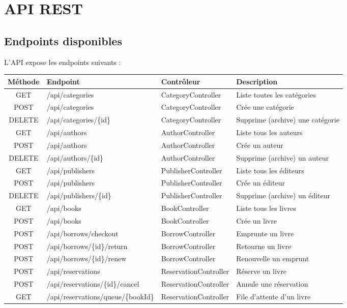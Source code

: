 \documentclass[12pt,a4paper,twoside]{report}
\begin{document}
\chapter{API REST}

\section{Endpoints disponibles}

L'API expose les endpoints suivants :

\begin{longtable}{c l l p{6cm}}
\hline
\rowcolor[gray]{0.9}
\textbf{Méthode} & \textbf{Endpoint} & \textbf{Contrôleur} & \textbf{Description} \\
\hline
\endfirsthead
\hline
\endfoot
GET & /api/categories & CategoryController & Liste toutes les catégories \\
POST & /api/categories & CategoryController & Crée une catégorie \\
DELETE & /api/categories/\{id\} & CategoryController & Supprime (archive) une catégorie \\
GET & /api/authors & AuthorController & Liste tous les auteurs \\
POST & /api/authors & AuthorController & Crée un auteur \\
DELETE & /api/authors/\{id\} & AuthorController & Supprime (archive) un auteur \\
GET & /api/publishers & PublisherController & Liste tous les éditeurs \\
POST & /api/publishers & PublisherController & Crée un éditeur \\
DELETE & /api/publishers/\{id\} & PublisherController & Supprime (archive) un éditeur \\
GET & /api/books & BookController & Liste tous les livres \\
POST & /api/books & BookController & Crée un livre \\
POST & /api/borrows/checkout & BorrowController & Emprunte un livre \\
POST & /api/borrows/\{id\}/return & BorrowController & Retourne un livre \\
POST & /api/borrows/\{id\}/renew & BorrowController & Renouvelle un emprunt \\
POST & /api/reservations & ReservationController & Réserve un livre \\
POST & /api/reservations/\{id\}/cancel & ReservationController & Annule une réservation \\
GET & /api/reservations/queue/\{bookId\} & ReservationController & File d'attente d'un livre \\
\hline
\end{longtable}
\end{document}
